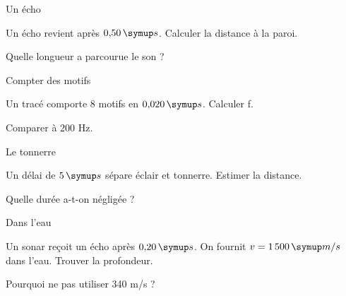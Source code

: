 \par\noindent\begin{minipage}{\linewidth}
\begin{exercice}[2]{Un écho}
\begin{questions}
\item Un écho revient après $0{,}50\unite s$. Calculer la distance à la paroi.
\item Quelle longueur a parcourue le son ?
\end{questions}
\end{exercice}
\end{minipage}
\par\noindent\begin{minipage}{\linewidth}
\begin{exercice}[2]{Compter des motifs}
\begin{questions}
\item Un tracé comporte $8$ motifs en $0{,}020\unite s$. Calculer f.
\item Comparer à 200 Hz.
\end{questions}
\end{exercice}
\end{minipage}
\clearpage
\par\noindent\begin{minipage}{\linewidth}
\begin{exercice}[2]{Le tonnerre}
\begin{questions}
\item Un délai de $5\unite s$ sépare éclair et tonnerre. Estimer la distance.
\item Quelle durée a-t-on négligée ?
\end{questions}
\end{exercice}
\end{minipage}
\par\noindent\begin{minipage}{\linewidth}
\begin{exercice}[2]{Dans l’eau}
\begin{questions}
\item Un sonar reçoit un écho après $0{,}20\unite s$. On fournit $v=1\,500\unite{m/s}$ dans l’eau. Trouver la profondeur.
\item Pourquoi ne pas utiliser 340 m/s ?
\end{questions}
\end{exercice}
\end{minipage}
